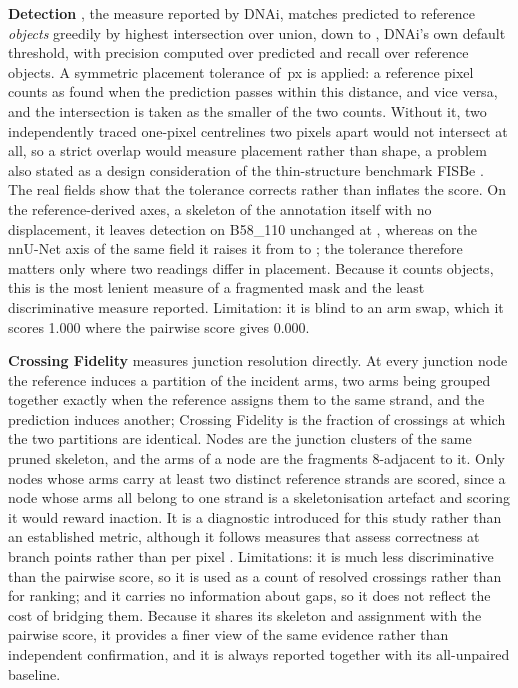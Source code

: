 \textbf{Detection \Fone{}}, the measure reported by DNAi, matches predicted to
reference \emph{objects} greedily by highest intersection over union, down to
\PlectaDetectionIoU{}, DNAi's own default threshold, with precision computed
over predicted and recall over reference objects. A symmetric placement
tolerance of \PlectaPlacementTolerance{}\,px is applied: a reference pixel
counts as found when the prediction passes within this distance, and vice
versa, and the intersection is taken as the smaller of the two counts. Without
it, two independently traced one-pixel centrelines two pixels apart would not
intersect at all, so a strict overlap would measure placement rather than
shape, a problem also stated as a design consideration of the thin-structure
benchmark FISBe \citep{mais2024fisbe}. The real fields show that the tolerance
corrects rather than inflates the score. On the reference-derived axes, a
skeleton of the annotation itself with no displacement, it leaves detection
\Fone{} on B58\_110 unchanged at \PlectaDetectionBFiveEightOneOneZeroManualTolerant{}, whereas on the nnU-Net
axis of the same field it raises it from
\PlectaDetectionBFiveEightOneOneZeroUNetStrict{} to
\PlectaDetectionBFiveEightOneOneZeroUNetTolerant{}; the tolerance therefore
matters only where two readings differ in placement. Because it counts objects,
this is the most lenient measure of a fragmented mask and the least
discriminative measure reported. Limitation: it is blind to an arm swap,
which it scores 1.000 where the pairwise score gives 0.000.

\textbf{Crossing Fidelity} measures junction resolution directly. At every
junction node the reference induces a partition of the incident arms, two arms
being grouped together exactly when the reference assigns them to the same
strand, and the prediction induces another; Crossing Fidelity is the fraction
of crossings at which the two partitions are identical. Nodes are the junction
clusters of the same pruned skeleton, and the arms of a node are the fragments
8-adjacent to it. Only nodes whose arms carry at least two distinct reference
strands are scored, since a node whose arms all belong to one strand is a
skeletonisation artefact and scoring it would reward inaction. It is a
diagnostic introduced for this study rather than an established metric,
although it follows measures that assess correctness at branch points rather
than per pixel \citep{gillette2011diademmetric,reilly2018nri}. Limitations: it
is much less discriminative than the pairwise score, so it is used as a count
of resolved crossings rather than for ranking; and it carries no information
about gaps, so it does not reflect the cost of bridging them. Because it shares
its skeleton and assignment with the pairwise score, it provides a finer view
of the same evidence rather than independent confirmation, and it is always
reported together with its all-unpaired baseline.

